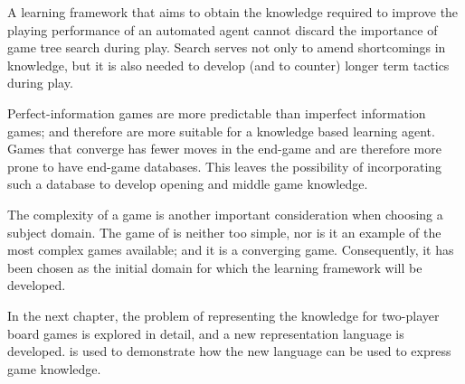 A learning framework that aims to obtain the knowledge required to improve the playing performance of an automated agent cannot discard the importance of game tree search during play.  Search serves not only to amend shortcomings in knowledge, but it is also needed to develop (and to counter) longer term tactics during play.

Perfect-information games are more predictable than imperfect information games; and therefore are more suitable for a knowledge based learning agent.  Games that converge has fewer moves in the end-game and are therefore more prone to have end-game databases.  This leaves the possibility of incorporating such a database to develop opening and middle game knowledge.  

The complexity of a game is another important consideration when choosing a subject domain.  The game of  is neither too simple, nor is it an example of the most complex games available; and it is a converging game.  Consequently, it has been chosen as the initial domain for which the learning framework will be developed.

In the next chapter, the problem of representing the knowledge for two-player board games is explored in detail, and a new representation language is developed.  is used to demonstrate how the new language can be used to express game knowledge.




